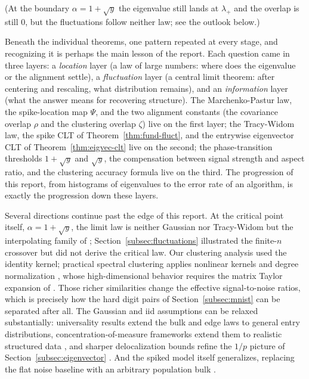 \noindent (At the boundary \(\alpha = 1 + \sqrt{y}\) the eigenvalue still lands at \(\lambda_+\) and the overlap is still \(0\), but the fluctuations follow neither law; see the outlook below.)

\medskip

Beneath the individual theorems, one pattern repeated at every stage, and recognizing it is perhaps the main lesson of the report. Each question came in three layers: a \emph{location} layer (a law of large numbers: where does the eigenvalue or the alignment settle), a \emph{fluctuation} layer (a central limit theorem: after centering and rescaling, what distribution remains), and an \emph{information} layer (what the answer means for recovering structure). The Marchenko-Pastur law, the spike-location map \(\Psi\), and the two alignment constants (the covariance overlap \(\rho\) and the clustering overlap \(\zeta\)) live on the first layer; the Tracy-Widom law, the spike CLT of Theorem~\ref{thm:fund-fluct}, and the entrywise eigenvector CLT of Theorem~\ref{thm:eigvec-clt} live on the second; the phase-transition thresholds \(1 + \sqrt{y}\) and \(\sqrt{y}\), the compensation between signal strength and aspect ratio, and the clustering accuracy formula live on the third. The progression of this report, from histograms of eigenvalues to the error rate of an algorithm, is exactly the progression down these layers.

Several directions continue past the edge of this report. At the critical point itself, \(\alpha = 1 + \sqrt{y}\), the limit law is neither Gaussian nor Tracy-Widom but the interpolating family of \citet{BaikBenArousPeche2005}; Section~\ref{subsec:fluctuations} illustrated the finite-\(n\) crossover but did not derive the critical law. Our clustering analysis used the identity kernel; practical spectral clustering applies nonlinear kernels and degree normalization \citep{vonLuxburg2007}, whose high-dimensional behavior requires the matrix Taylor expansion of \citet{CouilletBenaych2016}. Those richer similarities change the effective signal-to-noise ratios, which is precisely how the hard digit pairs of Section~\ref{subsec:mnist} can be separated after all. The Gaussian and iid assumptions can be relaxed substantially: universality results extend the bulk and edge laws to general entry distributions, concentration-of-measure frameworks extend them to realistic structured data \citep{CouilletLiao2022}, and sharper delocalization bounds refine the \(1/p\) picture of Section~\ref{subsec:eigenvector} \citep{BloemendalKnowlesYauYin2016}. And the spiked model itself generalizes, replacing the flat noise baseline with an arbitrary population bulk \citep{BaikSilverstein2006, YaoZhengBai2015}.

